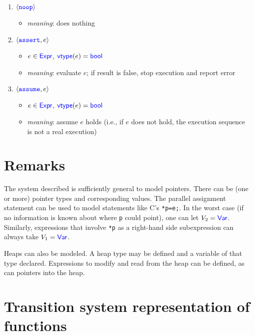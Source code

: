 \begin{enumerate}
\begin{itemize}
  \end{itemize}
\item $\langle\texttt{\textcolor{blue}{noop}}\rangle$
  \begin{itemize}
  \item \emph{meaning}: does nothing
  \end{itemize}
\item $\langle\texttt{\textcolor{blue}{assert}}, e\rangle$
  \begin{itemize}
  \item $e\in\textup{\textsf{\textcolor{blue}{Expr}}}$, $\textup{\textsf{\textcolor{blue}{vtype}}}(e)=\textup{\textsf{\textcolor{blue}{bool}}}$
  \item \emph{meaning}: evaluate $e$; if result is false, stop
    execution and report error
  \end{itemize}
\item  $\langle\texttt{\textcolor{blue}{assume}}, e\rangle$
  \begin{itemize}
  \item $e\in\textup{\textsf{\textcolor{blue}{Expr}}}$, $\textup{\textsf{\textcolor{blue}{vtype}}}(e)=\textup{\textsf{\textcolor{blue}{bool}}}$
  \item \emph{meaning}: assume $e$ holds (i.e., if $e$ does not hold,
    the execution sequence is not a real execution)
  \end{itemize}
\end{enumerate}

\section{Remarks}

The system described is sufficiently general to model pointers. There
can be (one or more) pointer types and corresponding values.  The
parallel assignment statement can be used to model statements like
C's \texttt{*p=e;}.  In the worst case (if no information is known
about where \texttt{p} could point), one can let $V_2=\textup{\textsf{\textcolor{blue}{Var}}}$.
Similarly, expressions that involve \texttt{*p} as a right-hand
side subexpression can always take $V_1=\textup{\textsf{\textcolor{blue}{Var}}}$.

Heaps can also be modeled.  A heap type may be defined and a variable
of that type declared.  Expressions to modify and read from the heap
can be defined, as can pointers into the heap.


\section{Transition system representation of functions}
\label{sec:gts}


